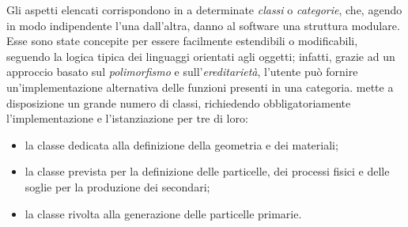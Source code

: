Gli aspetti elencati corrispondono in \geant{} a determinate \emph{classi} o \emph{categorie}, che, agendo in modo indipendente l'una dall'altra, danno al software una struttura modulare.
Esse sono state concepite per essere facilmente estendibili o modificabili, seguendo la logica tipica dei linguaggi orientati agli oggetti; infatti, grazie ad un approccio basato sul \emph{polimorfismo} e sull'\emph{ereditarietà}, l'utente può fornire un'implementazione alternativa delle funzioni presenti in una categoria.
\geant{} mette a disposizione un grande numero di classi, richiedendo obbligatoriamente l'implementazione e l'istanziazione per tre di loro: 
\begin{itemize}
	\item la classe dedicata alla definizione della geometria e dei materiali;
	\item la classe prevista per la definizione delle particelle, dei processi fisici e delle soglie per la produzione dei secondari;
	\item la classe rivolta alla generazione delle particelle primarie.
\end{itemize}



